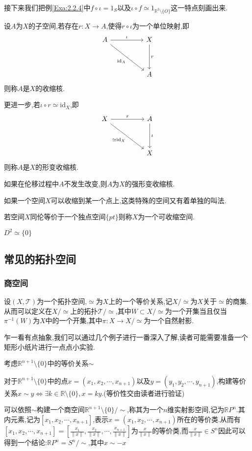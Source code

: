 \documentclass{article}
\begin{document}
接下来我们把例\ref{Exa:2.2.4}中$f \circ \iota = 1_S$以及$\iota \circ f \simeq 1_{\mathbb{R}^2 \setminus\{O\}}$这一特点刻画出来.
\begin{definition}
    设$A$为$X$的子空间,若存在$r : X \to A$,使得$r \circ \iota$为一个单位映射,即
    \[\begin{tikzcd}
	A && X \\
	\\
	&& A
	\arrow["\iota", from=1-1, to=1-3]
	\arrow["r", from=1-3, to=3-3]
	\arrow["{\text{id}_A}"', from=1-1, to=3-3]
\end{tikzcd}\]
则称$A$是$X$的收缩核.


更进一步,若$\iota \circ r \simeq \text{id}_X$,即
\[\begin{tikzcd}
	X && A \\
	\\
	&& X
	\arrow["r", from=1-1, to=1-3]
	\arrow["\iota", from=1-3, to=3-3]
	\arrow["{\simeq \text{id}_X}"', from=1-1, to=3-3]
\end{tikzcd}\]
则称$A$是$X$的形变收缩核.


如果在伦移过程中$A$不发生改变,则$A$为$X$的强形变收缩核.
\label{Def:2.2.8}
\end{definition}
如果一个空间$X$可以收缩到某一个点上,这类特殊的空间又有着单独的叫法.
\begin{definition}
    若空间$X$同伦等价于一个独点空间$\{pt\}$则称$X$为一个可收缩空间.
\end{definition}
\begin{example}
    $D^2 \simeq \{0\}$
\end{example}
\subsection{常见的拓扑空间}
\subsubsection{商空间}
\begin{definition}
    设$(X,\mathscr{T})$为一个拓扑空间,$\simeq$为$X$上的一个等价关系,记$X/\simeq$为$X$关于$\simeq$的商集.从而可以定义在$X/\simeq$上的拓扑$\mathscr{T}/\simeq$,其中$W\subset X/\simeq$为一个开集当且仅当$\pi^{-1}(W)$为$X$中的一个开集,其中$\pi : X \to X/\simeq$为一个自然射影.
\end{definition}
乍一看有点抽象,我们可以通过几个例子进行一番深入了解,读者可能需要准备一个矩形小纸片进行一点点小实验.
\begin{example}
    考虑$\mathbb{R}^{n+1}\setminus\{0\}$中的等价关系$\sim$


    对于$\mathbb{R}^{n+1}\setminus\{0\}$中的点$x = (x_1,x_2,\cdots,x_{n+1})$以及$y = (y_1,y_2,\cdots,y_{n+1})$,构建等价关系$x \sim y \Leftrightarrow \exists k \in \mathbb{R}\setminus\{0\}, x = ky$.(等价性交由读者进行验证)


    可以依照$\sim$构建一个商空间$\mathbb{R}^{n+1}\setminus\{0\}/\sim$,称其为一个$n$维实射影空间,记为$\mathbb{R}P^n$.其内元素,记为$[x_1,x_2,\cdots,x_{n+1}]$,表示$x = (x_1,x_2,\cdots,x_{n+1})$所在的等价类.从而有$[x_1,x_2,\cdots,x_{n+1}] = [\frac{x_1}{\|x\|},\frac{x_2}{\|x\|},\cdots,\frac{x_{n+1}}{\|x\|}]$为$\frac{x}{\|x\|}$的等价类,而$\frac{x}{\|x\|}\in S^n$因此可以得到一个结论:$\mathbb{R}P^n = S^n /\sim$,其中$x \sim -x$
\end{example}
\end{document}
